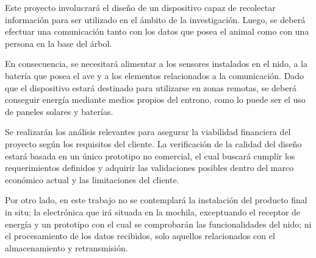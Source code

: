 Este proyecto involucrará el diseño de un dispositivo capaz de recolectar información para ser utilizado en el ámbito de la investigación. Luego, se deberá efectuar una comunicación tanto con los datos que posea el animal como con una persona en la base del árbol. 

En consecuencia, se necesitará alimentar a los sensores instalados en el nido, a la batería que posea el ave y a los elementos relacionados a la comunicación. Dado que el dispositivo estará destinado para utilizarse en zonas remotas, se deberá conseguir energía mediante medios propios del entrono, como lo puede ser el uso de paneles solares y baterías.

Se realizarán los análisis relevantes para asegurar la viabilidad financiera del proyecto según los requisitos del cliente. La verificación de la calidad del diseño estará basada en un único prototipo no comercial, el cual buscará cumplir los requerimientos definidos y adquirir las validaciones posibles dentro del marco económico actual y las limitaciones del cliente. 

Por otro lado, en este trabajo no se contemplará la instalación del producto final in situ; la electrónica que irá situada en la mochila, exceptuando el receptor de energía y un prototipo con el cual se comprobarán las funcionalidades del nido; ni el procesamiento de los datos recibidos, solo aquellos relacionados con el almacenamiento y retransmisión.

